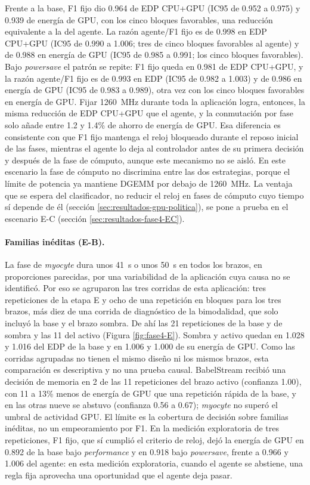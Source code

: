 Frente a la base, F1 fijo dio 0.964 de EDP CPU+GPU (IC95 de 0.952 a 0.975) y 0.939 de energía de GPU, con los cinco bloques favorables, una reducción equivalente a la del agente. La razón agente/F1 fijo es de 0.998 en EDP CPU+GPU (IC95 de 0.990 a 1.006; tres de cinco bloques favorables al agente) y de 0.988 en energía de GPU (IC95 de 0.985 a 0.991; los cinco bloques favorables). Bajo \textit{powersave} el patrón se repite: F1 fijo queda en 0.981 de EDP CPU+GPU, y la razón agente/F1 fijo es de 0.993 en EDP (IC95 de 0.982 a 1.003) y de 0.986 en energía de GPU (IC95 de 0.983 a 0.989), otra vez con los cinco bloques favorables en energía de GPU. Fijar 1260~MHz durante toda la aplicación logra, entonces, la misma reducción de EDP CPU+GPU que el agente, y la conmutación por fase solo añade entre 1.2 y 1.4\% de ahorro de energía de GPU. Esa diferencia es consistente con que F1 fijo mantenga el reloj bloqueado durante el reposo inicial de las fases, mientras el agente lo deja al controlador antes de su primera decisión y después de la fase de cómputo, aunque este mecanismo no se aisló. En este escenario la fase de cómputo no discrimina entre las dos estrategias, porque el límite de potencia ya mantiene DGEMM por debajo de 1260~MHz. La ventaja que se espera del clasificador, no reducir el reloj en fases de cómputo cuyo tiempo sí depende de él (sección \ref{sec:resultados-gpu-politica}), se pone a prueba en el escenario E-C (sección \ref{sec:resultados-fase4-EC}).

\paragraph{Familias inéditas (E-B).} La fase de \textit{myocyte} dura unos 41~s o unos 50~s en todos los brazos, en proporciones parecidas, por una variabilidad de la aplicación cuya causa no se identificó. Por eso se agruparon las tres corridas de esta aplicación: tres repeticiones de la etapa E y ocho de una repetición en bloques para los tres brazos, más diez de una corrida de diagnóstico de la bimodalidad, que solo incluyó la base y el brazo sombra. De ahí las 21 repeticiones de la base y de sombra y las 11 del activo (Figura \ref{fig:fase4-E}). Sombra y activo quedan en 1.028 y 1.016 del EDP de la base y en 1.006 y 1.000 de su energía de GPU. Como las corridas agrupadas no tienen el mismo diseño ni los mismos brazos, esta comparación es descriptiva y no una prueba causal. BabelStream recibió una decisión de memoria en 2 de las 11 repeticiones del brazo activo (confianza 1.00), con 11 a 13\% menos de energía de GPU que una repetición rápida de la base, y en las otras nueve se abstuvo (confianza 0.56 a 0.67); \textit{myocyte} no superó el umbral de actividad GPU. El límite es la cobertura de decisión sobre familias inéditas, no un empeoramiento por F1. En la medición exploratoria de tres repeticiones, F1 fijo, que sí cumplió el criterio de reloj, dejó la energía de GPU en 0.892 de la base bajo \textit{performance} y en 0.918 bajo \textit{powersave}, frente a 0.966 y 1.006 del agente: en esta medición exploratoria, cuando el agente se abstiene, una regla fija aprovecha una oportunidad que el agente deja pasar.

